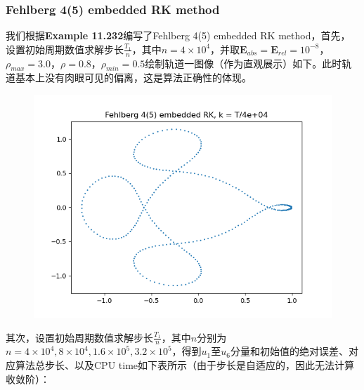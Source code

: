\documentclass{ctexart}
\begin{document}
\begin{sloppypar}
\subsubsection{Fehlberg 4(5) embedded RK method}
我们根据\textbf{Example 11.232}编写了Fehlberg 4(5) embedded RK method，首先，设置初始周期数值求解步长$\frac{T_1}{n}$，其中$n = 4 \times 10^4$，并取$\mathbf{E}_{abs}=\mathbf{E}_{rel}=10^{-8}$，$\rho_{max}=3.0$，$\rho = 0.8$，$\rho_{min} = 0.5$绘制轨道一图像（作为直观展示）如下。此时轨道基本上没有肉眼可见的偏离，这是算法正确性的体现。
\begin{figure}[H]
\centering
\includegraphics[scale = 0.45]{./report_src/Figure_35.png}
\end{figure}
其次，设置初始周期数值求解步长$\frac{T_1}{n}$，其中$n$分别为$n = 4 \times 10^4,8 \times 10^4,1.6 \times 10^5, 3.2 \times 10^5$，得到$u_1$至$u_6$分量和初始值的绝对误差、对应算法总步长、以及CPU time如下表所示（由于步长是自适应的，因此无法计算收敛阶）：


\end{sloppypar}
\end{document}
